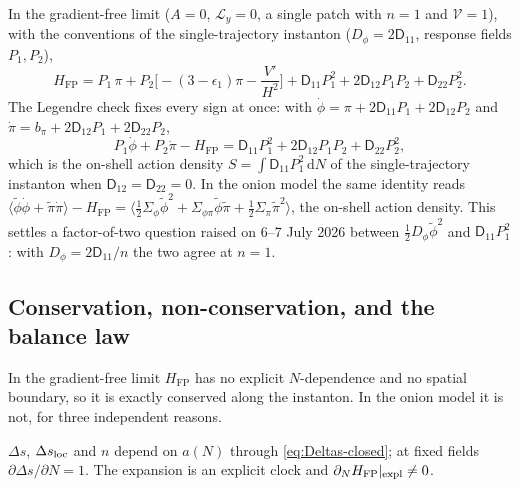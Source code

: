 \documentclass[a4paper,11pt]{article}
\newcommand{\semibold}[1]{{\fontseries{b}\selectfont{#1}}}
\newcommand{\para}[1]{\par\vspace{2mm}\noindent\semibold{{#1.}---}\ignorespaces}
\renewcommand{\d}{\mathrm{d}}
\newcommand{\Ny}{N}                          %
\newcommand{\epsSR}{\epsilon_1}              %
\newcommand{\Hub}{H}                         %
\newcommand{\field}{\phi}                    %
\newcommand{\mom}{\pi}                       %
\newcommand{\Vpot}{V}                        %
\newcommand{\rfield}{\widetilde\field}       %
\newcommand{\rmom}{\widetilde\mom}           %
\newcommand{\yco}{y}                         %
\newcommand{\Deltas}{\Delta s}                %
\newcommand{\advcoef}{A}                     %
\newcommand{\Lop}{\mathcal{L}_\yco}          %
\newcommand{\Dnoise}[1]{D_{#1}}              %
\newcommand{\Dcm}[1]{\mathsf{D}_{#1}}        %
\newcommand{\ncount}{n}                      %
\newcommand{\volel}{\mathcal{V}}             %
\newcommand{\Sigvol}[1]{\varSigma_{#1}}      %
\newcommand{\Hfp}{H_{\mathrm{FP}}}            %
\begin{document}
In the gradient-free limit ($\advcoef=0$, $\Lop=0$, a single patch with
$\ncount=1$ and $\volel=1$), with the conventions of the single-trajectory
instanton ($\Dnoise{\field}=2\Dcm{11}$, response fields $P_1,P_2$),
\begin{equation}
    \Hfp = P_1\,\mom + P_2\Big[-(3-\epsSR)\mom - \frac{\Vpot'}{\Hub^2}\Big]
    + \Dcm{11}P_1^2 + 2\Dcm{12}P_1P_2 + \Dcm{22}P_2^2 .
    \label{eq:hfp-1d}
\end{equation}
The Legendre check fixes every sign at once: with
$\dot\field=\mom+2\Dcm{11}P_1+2\Dcm{12}P_2$ and
$\dot\mom=b_\mom+2\Dcm{12}P_1+2\Dcm{22}P_2$,
\begin{equation}
    P_1\dot\field + P_2\dot\mom - \Hfp = \Dcm{11}P_1^2 + 2\Dcm{12}P_1P_2 + \Dcm{22}P_2^2 ,
\end{equation}
which is the on-shell action density $S=\int\Dcm{11}P_1^2\,\d\Ny$ of the
single-trajectory instanton when $\Dcm{12}=\Dcm{22}=0$. In the onion model
the same identity reads
$\langle\rfield\dot\field+\rmom\dot\mom\rangle-\Hfp
=\langle\tfrac12\Sigvol{\field}\rfield^2+\Sigvol{\field\mom}\rfield\rmom+\tfrac12\Sigvol{\mom}\rmom^2\rangle$,
the on-shell action density. This settles a factor-of-two question raised
on 6--7 July 2026 between $\tfrac12\Dnoise{\field}\rfield^2$ and
$\Dcm{11}P_1^2$: with $\Dnoise{\field}=2\Dcm{11}/\ncount$ the two agree
at $\ncount=1$.

\subsection{Conservation, non-conservation, and the balance law}

In the gradient-free limit $\Hfp$ has no explicit $\Ny$-dependence and no
spatial boundary, so it is exactly conserved along the instanton. In the
onion model it is not, for three independent reasons.

\para{Explicit $\Ny$-dependence} $\Deltas$, $\Deltas_{\rm loc}$ and
$\ncount$ depend on $a(\Ny)$ through \eqref{eq:Deltas-closed}; at fixed
fields $\partial\Deltas/\partial\Ny=1$. The expansion is an explicit clock
and $\partial_\Ny\Hfp|_{\rm expl}\neq0$.
\end{document}
